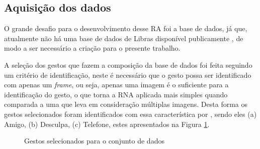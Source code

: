 \subsection{Aquisição dos dados}

\par O grande desafio para o desenvolvimento desse RA foi a base de dados, já que, atualmente não há uma base de dados de Libras disponível publicamente \cite{Magalh2018}, de modo a ser necessário a criação para o presente trabalho.

\par A seleção dos gestos que fazem a composição da base de dados foi feita seguindo um critério de identificação, neste é necessário que o gesto possa ser identificado com apenas um \textit{frame}, ou seja, apenas uma imagem é o suficiente para a identificação do gesto, o que torna a RNA aplicada mais simples quando comparada a uma que leva em consideração múltiplas imagens. Desta forma os gestos selecionados foram identificados com essa característica por , sendo eles (a) Amigo, (b) Desculpa, (c) Telefone, estes apresentados na Figura \ref{figure:gestos_selecionados}.

\begin{figure}[H]
    \centering
    \caption{Gestos selecionados para o conjunto de dados}
    \qquad
    \qquad
    \qquad
    \label{figure:gestos_selecionados}%
\end{figure}

